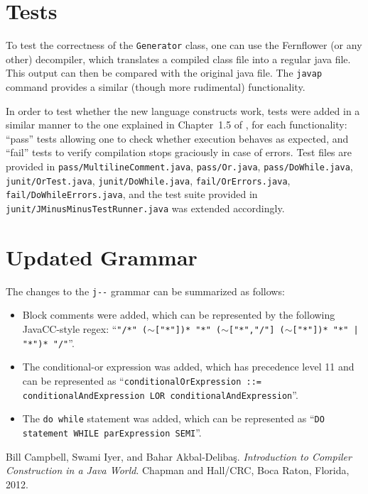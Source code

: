\documentclass[11pt]{article}
\newcommand{\java}[1]{\texttt{#1}}
\begin{document}
\section{Tests}
To test the correctness of the \java{Generator} class, one can use the Fernflower (or any other) decompiler, which translates a compiled class file into a regular java file.
This output can then be compared with the original java file.
The \texttt{javap} command provides a similar (though more rudimental) functionality.

In order to test whether the new language constructs work, tests were added in a similar manner to the one explained in Chapter~1.5 of \cite{compilers}, for each functionality: ``pass'' tests allowing one to check whether execution behaves as expected, and ``fail'' tests to verify compilation stops graciously in case of errors.
Test files are provided in \texttt{pass/MultilineComment.java}, \texttt{pass/Or.java}, \texttt{pass/DoWhile.java}, \texttt{junit/OrTest.java}, \texttt{junit/DoWhile.java}, \texttt{fail/OrErrors.java}, \texttt{fail/DoWhileErrors.java}, and the test suite provided in \texttt{junit/JMinusMinusTestRunner.java} was extended accordingly.

\section{Updated Grammar}
The changes to the \texttt{j-\(\)-} grammar can be summarized as follows:
\begin{itemize}
	\item Block comments were added, which can be represented by the following JavaCC-style regex:
	\newline``\texttt{"/*" (\(\sim\)["*"])* "*" (\(\sim\)["*","/"] (\(\sim\)["*"])* "*" | "*")* "/"}''.
	\item The conditional-or expression was added, which has precedence level 11 and can be represented as
	\newline``\texttt{conditionalOrExpression ::= conditionalAndExpression {LOR conditionalAndExpression}}''.
	\item The \java{do while} statement was added, which can be represented as 
	\newline``\texttt{DO statement WHILE parExpression SEMI}''.
\end{itemize}

\begin{thebibliography}{9}
	Bill Campbell, Swami Iyer, and Bahar Akbal-Deliba\c s.
	\textit{Introduction to Compiler Construction in a Java World}.
	Chapman and Hall/CRC, Boca Raton, Florida, 2012.
\end{thebibliography}
\end{document}
